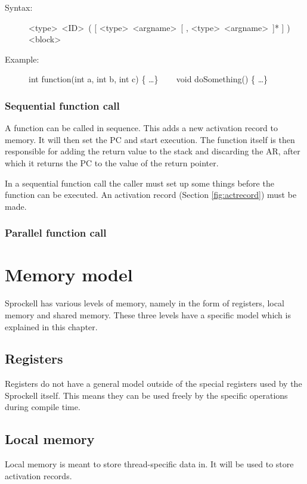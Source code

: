 \documentclass[10pt,a4paper]{report}
\begin{document}
\begin{description}
	\item[Syntax:] 
		\textless type\textgreater ~\textless ID\textgreater ~( [ \textless type\textgreater ~\textless argname\textgreater ~[ , \textless type\textgreater ~\textless argname\textgreater ~]* ] ) \textless block\textgreater
	\item[Example:] 
		int function(int a, int b, int c) \{ \ldots \} ~~~
		void doSomething() \{ \ldots \}
\end{description} 



\subsubsection{Sequential function call}
A function can be called in sequence. This adds a new activation record to memory. It will then set the PC and start execution. The function itself is then responsible for adding the return value to the stack and discarding the AR, after which it returns the PC to the value of the return pointer.


In a sequential function call the caller must set up some things before the function can be executed. An activation record (Section \ref{fig:actrecord}) must be made. 



\subsubsection{Parallel function call}






\section{Memory model}
Sprockell has various levels of memory, namely in the form of registers, local memory and shared memory. These three levels have a specific model which is explained in this chapter.

\subsection{Registers}
Registers do not have a general model outside of the special registers used by the Sprockell itself. This means they can be used freely by the specific operations during compile time.

\subsection{Local memory}
Local memory is meant to store thread-specific data in. It will be used to store activation records. 
\end{document}
